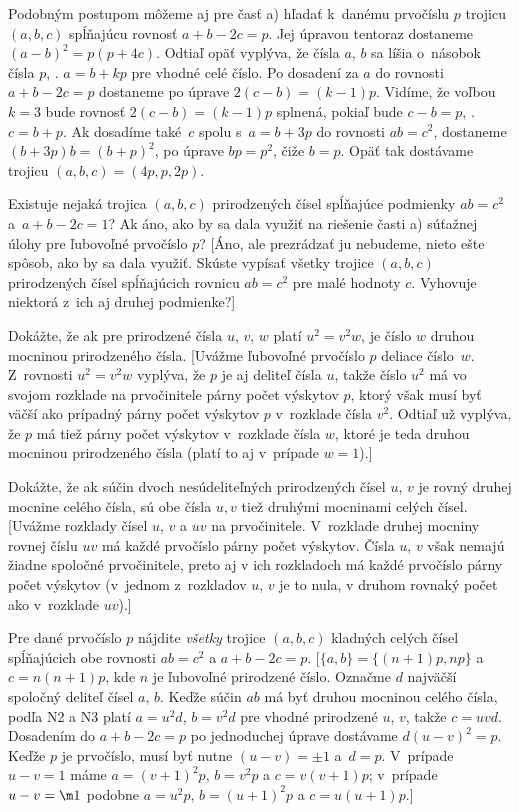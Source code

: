 {Podobným postupom môžeme aj pre časť a) hľadať k~danému prvočíslu $p$
trojicu $(a,b,c)$ spĺňajúcu rovnosť $a+b-2c=p$. Jej úpravou
tentoraz dostaneme $(a-b)^2=p(p+4c)$. Odtiaľ opäť vyplýva, že čísla
$a$, $b$ sa líšia o~násobok čísla $p$, \tj. $a=b+kp$ pre vhodné
celé číslo. Po dosadení za $a$ do rovnosti $a+b-2c=p$ dostaneme
po úprave $2(c-b)=(k-1)p$. Vidíme, že voľbou $k=3$ bude
rovnosť $2(c-b)=(k-1)p$ splnená, pokiaľ bude $c-b=p$,
\tj. $c=b+p$. Ak dosadíme také~$c$ spolu s~$a=b+3p$ do rovnosti
$ab=c^2$, dostaneme $(b+3p)b=(b+p)^2$, po úprave $bp=p^2$, čiže
$b=p$. Opäť tak dostávame trojicu $(a,b,c)=(4p,p,2p)$.

Existuje nejaká trojica $(a,b,c)$ prirodzených čísel
spĺňajúce podmienky $ab=c^2$ a~${a+b-2c} = 1$? Ak áno, ako by sa
dala využiť na riešenie časti a) súťažnej úlohy pre ľubovoľné
prvočíslo $p$?
[Áno, ale prezrádzať ju nebudeme, nieto ešte spôsob, ako by sa dala
využiť. Skúste vypísať všetky trojice $(a,b,c)$ prirodzených čísel
spĺňajúcich rovnicu $ab=c^2$ pre malé hodnoty $c$.
Vyhovuje niektorá z~ich aj druhej podmienke?]

Dokážte, že ak pre prirodzené čísla $u$, $v$, $w$ platí
$u^2=v^2w$, je číslo $w$ druhou mocninou prirodzeného čísla.
[Uvážme ľubovoľné prvočíslo $p$ deliace číslo~$w$.
Z~rovnosti $u^2=v^2w$ vyplýva, že $p$ je aj deliteľ čísla $u$,
takže číslo $u^2$ má vo svojom rozklade na prvočinitele
párny počet výskytov $p$,
ktorý však musí byť väčší ako prípadný párny počet výskytov $p$
v~rozklade čísla $v^2$. Odtiaľ už vyplýva, že $p$ má tiež párny
počet výskytov v~rozklade čísla $w$, ktoré je teda druhou
mocninou prirodzeného čísla (platí to aj v~prípade $w=1$).]

Dokážte, že ak súčin dvoch nesúdeliteľných prirodzených čísel
$u$, $v$ je rovný druhej mocnine celého čísla, sú
obe čísla $u, v$ tiež druhými mocninami celých čísel.
[Uvážme rozklady čísel $u$, $v$ a $uv$ na prvočinitele.
V~rozklade druhej mocniny rovnej číslu $uv$
má každé prvočíslo párny počet výskytov.
Čísla $u$, $v$ však nemajú žiadne spoločné
prvočinitele, preto aj v ich rozkladoch má každé prvočíslo
párny počet výskytov (v~jednom z~rozkladov $u$, $v$ je to nula, v druhom
rovnaký počet ako v~rozklade $uv$).]

\D
Pre dané prvočíslo $p$ nájdite {\it všetky\/} trojice
$(a,b,c)$ kladných celých čísel spĺňajúcich obe rovnosti
$ab=c^2$ a $a+b-2c=p$. [$\{a,b\}=\{(n+1)p,np\}$ a $c=n(n+1)p$,
kde $n$ je ľubovoľné prirodzené číslo.
Označme $d$ najväčší spoločný deliteľ čísel $a$, $b$. Keďže
súčin $ab$ má byť druhou mocninou celého čísla, podľa N2 a N3
platí $a = u^2d$, $b = v^2d$ pre vhodné prirodzené $u$, $v$, takže
$c=uvd$. Dosadením do $a+b-2c=p$ po jednoduchej úprave dostávame
$d(u-v)^2 = p$. Keďže $p$ je prvočíslo, musí byť nutne
$(u-v) =\pm 1$ a~$d=p$. V~prípade $u-v=1$ máme $a=(v+1)^2p$, $b=v^2p$
a $c=v(v+1)p$; v~prípade $u-v=\m1$ podobne $a=u^2p$, $b=(u+1)^2p$ a
$c=u(u+1)p$.]

}
